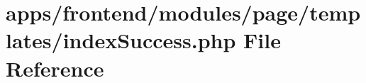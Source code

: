 \hypertarget{frontend_2modules_2page_2templates_2index_success_8php}{\section{apps/frontend/modules/page/templates/index\-Success.php File Reference}
\label{frontend_2modules_2page_2templates_2index_success_8php}
}
